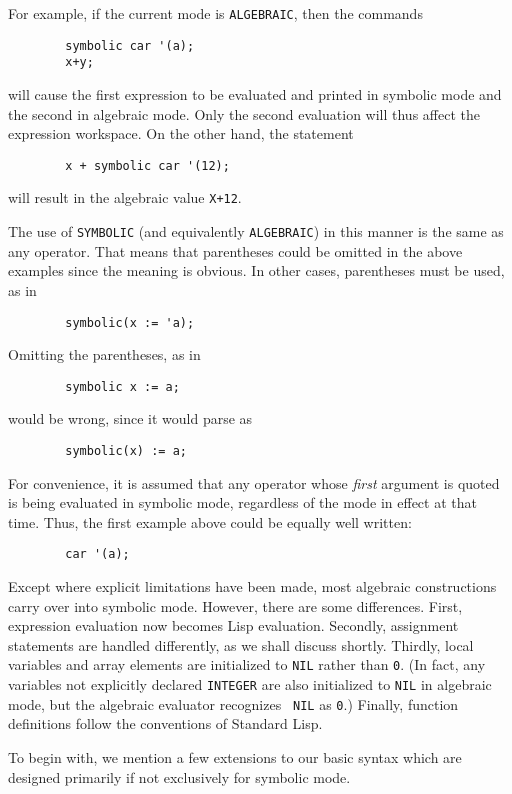 For example, if the current mode is {\tt ALGEBRAIC}, then the commands
\begin{verbatim}
        symbolic car '(a);
        x+y;
\end{verbatim}
will cause the first expression to be evaluated and printed in symbolic
mode and the second in algebraic mode. Only the second evaluation will
thus affect the expression workspace. On the other hand, the statement
\begin{verbatim}
        x + symbolic car '(12);
\end{verbatim}
will result in the algebraic value {\tt X+12}.

The use of {\tt SYMBOLIC} (and equivalently {\tt ALGEBRAIC}) in this
manner is the same as any operator.  That means that parentheses could be
omitted in the above examples since the meaning is obvious.  In other
cases, parentheses must be used, as in

\begin{verbatim}
        symbolic(x := 'a);
\end{verbatim}
Omitting the parentheses, as in
\begin{verbatim}
        symbolic x := a;
\end{verbatim}
would be wrong, since it would parse as
\begin{verbatim}
        symbolic(x) := a;
\end{verbatim}
For convenience, it is assumed that any operator whose {\em first\/} argument is
quoted is being evaluated in symbolic mode, regardless of the mode in
effect at that time. Thus, the first example above could be equally well
written:
\begin{verbatim}
        car '(a);
\end{verbatim}
Except where explicit limitations have been made, most {\REDUCE} algebraic
constructions carry over into symbolic mode.
However, there are some differences.  First, expression evaluation now
becomes Lisp evaluation.  Secondly, assignment statements are handled
differently, as we shall discuss shortly.  Thirdly, local variables and array
elements are initialized to {\tt NIL} rather than {\tt 0}. (In fact, any
variables not explicitly declared {\tt INTEGER} are also initialized to
{\tt NIL} in algebraic mode, but the algebraic evaluator recognizes {\tt
NIL} as {\tt 0}.) Finally, function definitions follow the conventions of
Standard Lisp.

To begin with, we mention a few extensions to our basic syntax which are
designed primarily if not exclusively for symbolic mode.

